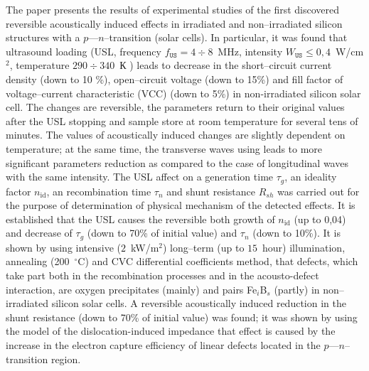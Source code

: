 The paper presents the results of experimental studies of the first discovered reversible acoustically induced effects in irradiated and non--irradiated silicon structures with a $p$---$n$--transition (solar cells).
In particular, it was found that ultrasound loading (USL, frequency $f_\mathtt{US}=4\div8$~MHz, intensity $W_\mathtt{US}\leq0,4$~W/cm$^2$, temperature $290\div340$~К ) leads to decrease in the short--circuit current density (down to 10 \%), open--circuit voltage (down to 15\%) and fill factor of voltage--current characteristic (VCC) (down to 5\%) in non-irradiated silicon solar cell.
The changes are reversible, the parameters return to their original values after the USL stopping and sample store at room temperature for several tens of minutes.
The values of acoustically induced changes are slightly dependent on temperature;
at the same time, the transverse waves using leads to more significant parameters reduction as compared to the case of longitudinal waves with the same intensity.
The USL affect on a generation time $\tau_{g}$,
an ideality factor $n_\mathrm{id}$,
an recombination time $\tau_n$
and shunt resistance $R_{sh}$ was carried out for the purpose of determination of physical mechanism of the detected effects.
It is established that the USL causes the reversible both growth of $n_\mathrm{id}$  (up to 0,04) and
decrease of $\tau_g$ (down to 70\% of initial value) and $\tau_n$ (down to 10\%).
It is shown by using intensive ($2$~kW/m$^2$) long--term (up to $15$~hour) illumination,
annealing (200~$^\circ$C) and
CVC differential coefficients  method,
that defects, which take part both in the recombination processes and in the acousto-defect interaction, are oxygen precipitates  (mainly) and
pairs Fe$_i$B$_s$ (partly) in non--irradiated silicon solar cells.
A reversible acoustically induced reduction in the shunt resistance (down to 70\% of initial value) was found;
it was shown by  using the model of the dislocation-induced impedance that effect is caused by the increase in the electron capture efficiency of linear defects located in the $p$---$n$--transition region.


